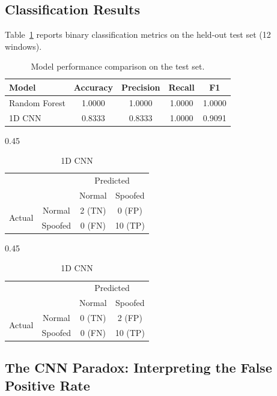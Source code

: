 \documentclass[11pt,a4paper]{article}
\begin{document}
\subsection{Classification Results}

Table~\ref{tab:model_perf} reports binary classification metrics on the held-out test set (12 windows).

\begin{table}[H]
\centering
\caption{Model performance comparison on the test set.}
\label{tab:model_perf}
\begin{tabular}{@{}lcccc@{}}
\toprule
\textbf{Model} & \textbf{Accuracy} & \textbf{Precision} & \textbf{Recall} & \textbf{F1} \\
\midrule
Random Forest & 1.0000 & 1.0000 & 1.0000 & 1.0000 \\
1D CNN & 0.8333 & 0.8333 & 1.0000 & 0.9091 \\
\bottomrule
\end{tabular}
\end{table}

\begin{table}[H]
\centering
\caption{Confusion matrices for both models.}
\label{tab:confusion}
\begin{subtable}[t]{0.45\textwidth}
\centering
\caption{Random Forest}
\begin{tabular}{@{}cc|cc@{}}
\toprule
& & \multicolumn{2}{c}{Predicted} \\
& & Normal & Spoofed \\
\midrule
\multirow{2}{*}{Actual} & Normal & 2 (TN) & 0 (FP) \\
& Spoofed & 0 (FN) & 10 (TP) \\
\bottomrule
\end{tabular}
\end{subtable}
\hfill
\begin{subtable}[t]{0.45\textwidth}
\centering
\caption{1D CNN}
\begin{tabular}{@{}cc|cc@{}}
\toprule
& & \multicolumn{2}{c}{Predicted} \\
& & Normal & Spoofed \\
\midrule
\multirow{2}{*}{Actual} & Normal & 0 (TN) & 2 (FP) \\
& Spoofed & 0 (FN) & 10 (TP) \\
\bottomrule
\end{tabular}
\end{subtable}
\end{table}

\subsection{The CNN Paradox: Interpreting the False Positive Rate}
\end{document}
